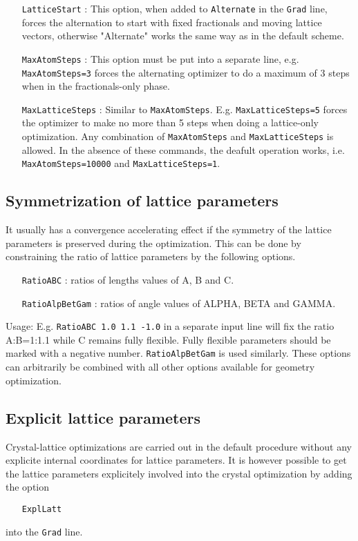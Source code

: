 \documentclass[prl,aps,preprint,superbib,12pt]{revtex4}
\begin{document}
\begin{itemize}
\item[{\tt LatticeStart}] :
This option, when added to {\tt Alternate} in the {\tt Grad} line,
forces the alternation to start with fixed fractionals and moving
lattice vectors, otherwise "Alternate" works the same way as in the 
default scheme.
\end{itemize}

\begin{itemize}
\item[{\tt MaxAtomSteps}] :
This option must be put into a separate line, e.g. {\tt MaxAtomSteps=3}
forces the alternating optimizer to do a maximum of 3 steps 
when in the fractionals-only phase.    
\end{itemize}

\begin{itemize}
\item[{\tt MaxLatticeSteps}] :
Similar to {\tt MaxAtomSteps}. E.g. {\tt MaxLatticeSteps=5} forces the optimizer
to make no more than 5 steps when doing a lattice-only optimization.
Any combination of {\tt MaxAtomSteps} and {\tt MaxLatticeSteps} is allowed.
In the absence of these commands, the deafult operation works, i.e.
{\tt MaxAtomSteps=10000} and {\tt MaxLatticeSteps=1}.
\end{itemize}

\subsection{Symmetrization of lattice parameters}
It usually has a convergence accelerating effect if the symmetry of the
lattice parameters is preserved during the optimization.
This can be done by constraining the ratio of lattice parameters
by the following options.
\begin{itemize}
\item[{\tt RatioABC}] : ratios of lengths values of A, B and C.
\item[{\tt RatioAlpBetGam}] : ratios of angle values of ALPHA, 
BETA and GAMMA.
\end{itemize}
Usage: E.g. {\tt RatioABC 1.0 1.1 -1.0} in a separate input line
will fix the ratio A:B=1:1.1 while C remains fully flexible. 
Fully flexible parameters should be marked with a negative number.
{\tt RatioAlpBetGam} is used similarly.
These options can arbitrarily be combined with all other options 
available for geometry optimization.

\subsection{Explicit lattice parameters}
Crystal-lattice optimizations are carried out in the default procedure 
without any explicite internal coordinates for lattice parameters.
It is however possible to get the lattice parameters explicitely
involved into the crystal optimization by adding the option
\begin{itemize}
\item[{\tt ExplLatt}] 
\end{itemize}
into the {\tt Grad} line.
\end{document}
